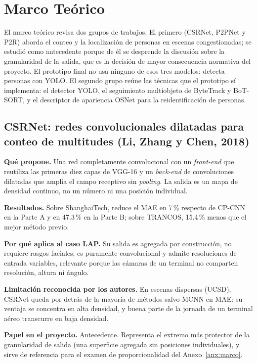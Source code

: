 \section{Marco Teórico}
\label{sec:marco-teorico}

El marco teórico revisa dos grupos de trabajos. El primero (CSRNet, P2PNet y P2R) aborda el
conteo y la localización de personas en escenas congestionadas; se estudió como antecedente
porque de él se desprende la discusión sobre la granularidad de la salida, que es la decisión de
mayor consecuencia normativa del proyecto. El prototipo final no usa ninguno de esos tres
modelos: detecta personas con YOLO. El segundo grupo reúne las técnicas que el prototipo sí
implementa: el detector YOLO, el seguimiento multiobjeto de ByteTrack y BoT-SORT, y el
descriptor de apariencia OSNet para la reidentificación de personas.

\subsection{CSRNet: redes convolucionales dilatadas para conteo de multitudes (Li, Zhang
y Chen, 2018)}
\label{subsec:csrnet}

\textbf{Qué propone.} Una red completamente convolucional con un \emph{front-end} que
reutiliza las primeras diez capas de VGG-16 y un \emph{back-end} de convoluciones dilatadas
que amplía el campo receptivo sin \emph{pooling}. La salida es un mapa de densidad continuo,
no un número ni una posición individual.

\textbf{Resultados.} Sobre ShanghaiTech, reduce el MAE en 7\,\% respecto de CP-CNN en la
Parte A y en 47.3\,\% en la Parte B; sobre TRANCOS, 15.4\,\% menos que el mejor método
previo.

\textbf{Por qué aplica al caso LAP.} Su salida es agregada por construcción, no requiere
rasgos faciales; es puramente convolucional y admite resoluciones de entrada variables,
relevante porque las cámaras de un terminal no comparten resolución, altura ni ángulo.

\textbf{Limitación reconocida por los autores.} En escenas dispersas (UCSD), CSRNet
queda por detrás de la mayoría de métodos salvo MCNN en MAE: su ventaja se concentra en
alta densidad, y buena parte de la jornada de un terminal aéreo transcurre en baja densidad.

\textbf{Papel en el proyecto.} Antecedente. Representa el extremo más protector de la
granularidad de salida (una superficie agregada sin posiciones individuales), y sirve de
referencia para el examen de proporcionalidad del Anexo~\ref{anx:marco}.

